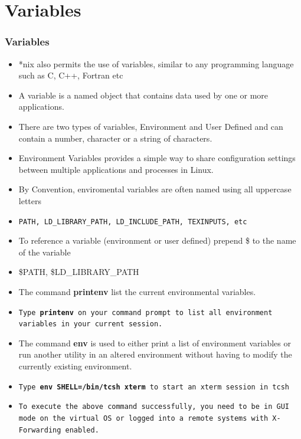 \documentclass[slidestop,mathserif,compress,xcolor=svgnames]{beamer}
\newcommand*\vardiamond{\textcolor{tigerspurple}{%
  \ensuremath{\blacklozenge}}}
\begin{document}
\section{Variables}
\begin{frame}
  \frametitle{\small Variables}
  \begin{itemize}
    \item *nix also permits the use of variables, similar to any programming language such as C, C++, Fortran etc
    \item A variable is a named object that contains data used by one or more applications. 
    \item There are two types of variables, Environment and User Defined and can contain  a number, character or a string of characters.
    \item Environment Variables provides a simple way to share configuration settings between multiple applications and processes in Linux.
    \item By Convention, enviromental variables are often named using all uppercase letters
    \item[e.g.] \texttt{PATH, LD\_LIBRARY\_PATH, LD\_INCLUDE\_PATH, TEXINPUTS, etc}
    \item To reference a variable (environment or user defined) prepend \$ to the name of the variable
    \item[e.g.] \$PATH, \$LD\_LIBRARY\_PATH
    \framebreak
%
    \item The command \textbf{printenv} list the current environmental variables.
    \item[$\bigstar$] \texttt{Type \textbf{printenv} on your command prompt to list all environment variables in your current session.}
    \item The command \textbf{env} is used to either print a list of environment variables or run another utility in an altered environment without having to modify the currently existing environment.
    \item[$\bigstar$] \texttt{Type \textbf{env SHELL=/bin/tcsh xterm} to start an xterm session in tcsh}
    \item[$\vardiamond$] \texttt{To execute the above command successfully, you need to be in GUI mode on the virtual OS or logged into a remote systems with X-Forwarding enabled.}

\end{itemize}
\end{frame}
\end{document}
